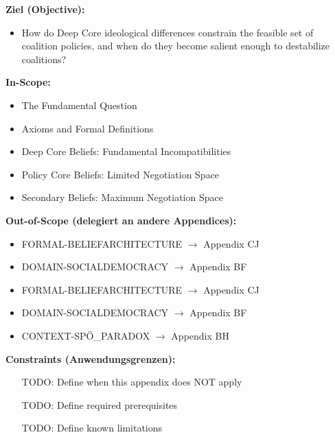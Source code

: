 

\begin{tcolorbox}[
    colback=orange!5!white,
    colframe=orange!75!black,
    title={\textbf{Appendix Scope: Ziel / In-Scope / Out-of-Scope / Constraints}},
    fonttitle=\bfseries
]

\textbf{Ziel (Objective):}
\begin{itemize}[nosep]
    \item How do Deep Core ideological differences constrain the feasible set of coalition policies, and when do they become salient enough to destabilize coalitions?
\end{itemize}

\textbf{In-Scope:}
\begin{itemize}[nosep]
    \item The Fundamental Question
    \item Axioms and Formal Definitions
    \item Deep Core Beliefs: Fundamental Incompatibilities
    \item Policy Core Beliefs: Limited Negotiation Space
    \item Secondary Beliefs: Maximum Negotiation Space
\end{itemize}

\textbf{Out-of-Scope (delegiert an andere Appendices):}
\begin{itemize}[nosep]
    \item FORMAL-BELIEFARCHITECTURE $\rightarrow$ Appendix CJ
    \item DOMAIN-SOCIALDEMOCRACY $\rightarrow$ Appendix BF
    \item FORMAL-BELIEFARCHITECTURE $\rightarrow$ Appendix CJ
    \item DOMAIN-SOCIALDEMOCRACY $\rightarrow$ Appendix BF
    \item CONTEXT-SPÖ_PARADOX $\rightarrow$ Appendix BH
\end{itemize}

\textbf{Constraints (Anwendungsgrenzen):}
\begin{itemize}[nosep]
    \item [TODO: Define when this appendix does NOT apply]
    \item [TODO: Define required prerequisites]
    \item [TODO: Define known limitations]
\end{itemize}


\end{tcolorbox}
